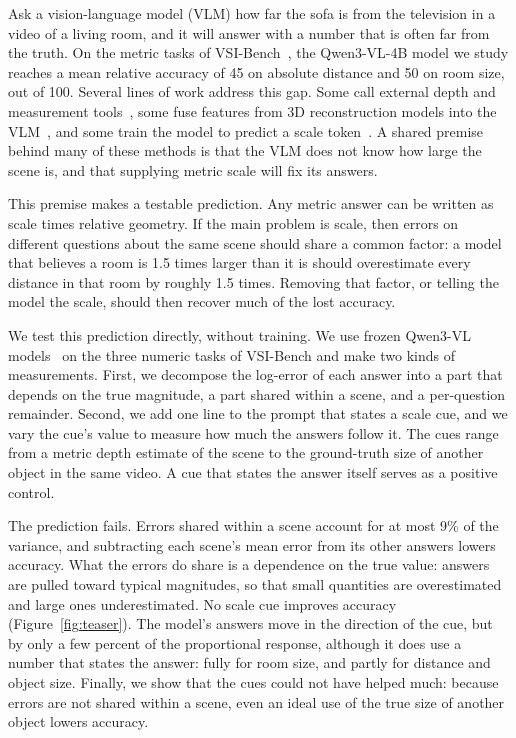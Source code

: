 \documentclass[letterpaper]{article} %
\begin{document}
Ask a vision-language model (VLM) how far the sofa is from the television in a video of a living room, and it will answer with a number that is often far from the truth. On the metric tasks of VSI-Bench~\citep{yang2025thinking}, the Qwen3-VL-4B model we study reaches a mean relative accuracy of 45 on absolute distance and 50 on room size, out of 100. Several lines of work address this gap. Some call external depth and measurement tools~\citep{glantz2026seeing,izhac2026spacemcp}, some fuse features from 3D reconstruction models into the VLM~\citep{fan2025vlm3r,li2025spatialforcing}, and some train the model to predict a scale token~\citep{zhou2025robotracer}. A shared premise behind many of these methods is that the VLM does not know how large the scene is, and that supplying metric scale will fix its answers.

This premise makes a testable prediction. Any metric answer can be written as scale times relative geometry. If the main problem is scale, then errors on different questions about the same scene should share a common factor: a model that believes a room is 1.5 times larger than it is should overestimate every distance in that room by roughly 1.5 times. Removing that factor, or telling the model the scale, should then recover much of the lost accuracy.

We test this prediction directly, without training. We use frozen Qwen3-VL models~\citep{bai2025qwen3vl} on the three numeric tasks of VSI-Bench and make two kinds of measurements. First, we decompose the log-error of each answer into a part that depends on the true magnitude, a part shared within a scene, and a per-question remainder. Second, we add one line to the prompt that states a scale cue, and we vary the cue's value to measure how much the answers follow it. The cues range from a metric depth estimate of the scene to the ground-truth size of another object in the same video. A cue that states the answer itself serves as a positive control.

The prediction fails. Errors shared within a scene account for at most 9\% of the variance, and subtracting each scene's mean error from its other answers lowers accuracy. What the errors do share is a dependence on the true value: answers are pulled toward typical magnitudes, so that small quantities are overestimated and large ones underestimated. No scale cue improves accuracy (Figure~\ref{fig:teaser}). The model's answers move in the direction of the cue, but by only a few percent of the proportional response, although it does use a number that states the answer: fully for room size, and partly for distance and object size. Finally, we show that the cues could not have helped much: because errors are not shared within a scene, even an ideal use of the true size of another object lowers accuracy.
\end{document}
